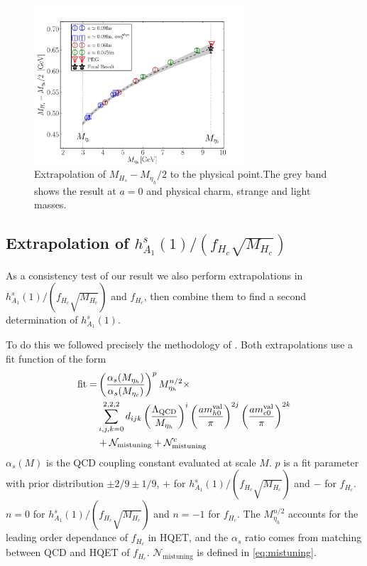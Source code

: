 \begin{figure}[htb!]
  \begin{center}
  \includegraphics[width=0.70\textwidth]{images/BsDsstar/MHs-Metah.pdf}
  \caption{Extrapolation of $M_{H_s}-M_{\eta_h}/2$ to the physical point.The grey band shows the result at $a=0$ and physical charm, strange and light masses. \label{fig:MHsmasses}}
  \end{center}
\end{figure}

\subsection{Extrapolation of $h_{A_1}^s(1)/(f_{H_c}\sqrt{M_{H_c}})$}
\label{sec:ratio_extrap}

As a consistency test of our result we also perform extrapolations in $h_{A_1}^s(1)/(f_{H_c}\sqrt{M_{H_c}})$ and $f_{H_c}$, then combine them to find a second determination of $h_{A_1}^s(1)$.

To do this we followed precisely the methodology of \cite{McNeile:2012qf}. Both extrapolations use a fit function of the form
\begin{align}
  \label{eq:fitfun_ratio}
  \nonumber
  \text{fit} = &\left({\alpha_s(M_{\eta_h})\over\alpha_s(M_{\eta_c})}\right)^p M_{\eta_h}^{n/2} \times \\ &\sum_{i,j,k=0}^{2,2,2} d_{ijk} \left({\Lambda_{\text{QCD}}\over M_{\eta_h} }\right)^{i} \left({ am^{\text{val}}_{h0} \over \pi }\right)^{2j} \left({ am^{\text{val}}_{c0} \over \pi }\right)^{2k} \\
  &+ \mathcal{N}_{\text{mistuning}} + \mathcal{N}^c_{\text{mistuning}}
  \nonumber
\end{align}
$\alpha_s(M)$ is the QCD coupling constant evaluated at scale $M$. $p$ is a fit parameter with prior distribution $\pm2/9\pm 1/9$, $+$ for $h_{A_1}^s(1)/(f_{H_c}\sqrt{M_{H_c}})$ and $-$ for $f_{H_c}$. $n=0$ for $h_{A_1}^s(1)/(f_{H_c}\sqrt{M_{H_c}})$ and $n=-1$ for $f_{H_c}$. The $M_{\eta_h}^{n/2}$ accounts for the leading order dependance of $f_{H_c}$ in HQET, and the $\alpha_s$ ratio comes from matching between QCD and HQET of $f_{H_c}$. $\mathcal{N}_{\text{mistuning}}$ is defined in \ref{eq:mistuning}. 


